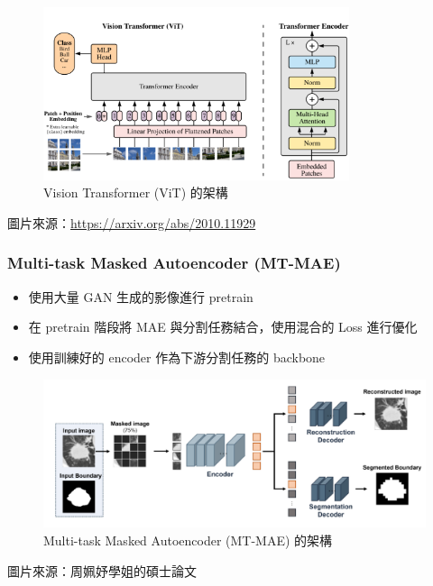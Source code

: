 \documentclass[xcolor=dvipsnames]{beamer}
\begin{document}
    \begin{frame}
        \begin{figure}
            \centering
            \includegraphics[width=0.8\textwidth]{src/ViT.png}
            \caption{Vision Transformer (ViT) 的架構}
            \label{fig:vit_architecture}
        \end{figure}
        圖片來源：\url{https://arxiv.org/abs/2010.11929}
    \end{frame}

    \begin{frame}
        \frametitle{Multi-task Masked Autoencoder (MT-MAE)}
        \begin{itemize}
            \item 使用大量 GAN 生成的影像進行 pretrain
            \item 在 pretrain 階段將 MAE 與分割任務結合，使用混合的 Loss 進行優化
            \item 使用訓練好的 encoder 作為下游分割任務的 backbone
        \end{itemize}
    \end{frame}

    \begin{frame}
        \begin{figure}
            \centering
            \includegraphics[width=1\textwidth]{src/MTMAE.png}
            \caption{Multi-task Masked Autoencoder (MT-MAE) 的架構}
            \label{fig:mtmae_architecture}
        \end{figure}
        圖片來源：周姵妤學姐的碩士論文
    \end{frame}
\end{document}
